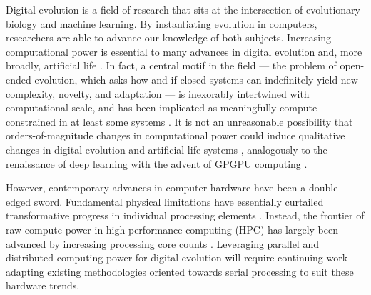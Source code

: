 Digital evolution is a field of research that sits at the intersection of evolutionary biology and machine learning.
By instantiating evolution in computers, researchers are able to advance our knowledge of both subjects.
Increasing computational power is essential to many advances in digital evolution and, more broadly, artificial life \citep{ackley2014indefinitely}.
In fact, a central motif in the field --- the problem of open-ended evolution, which asks how and if closed systems can indefinitely yield new complexity, novelty, and adaptation --- is inexorably intertwined with computational scale, and has been implicated as meaningfully compute-constrained in at least some systems \citep{taylor2016open,channon2019maximum}.
It is not an unreasonable possibility that orders-of-magnitude changes in computational power could induce qualitative changes in digital evolution and artificial life systems \citep{moreno2022engineering}, analogously to the renaissance of deep learning with the advent of GPGPU computing \citep{krizhevsky2012imagenet}.

However, contemporary advances in computer hardware have been a double-edged sword.
Fundamental physical limitations have essentially curtailed transformative progress in individual processing elements \citep{sutter2005free}.
Instead, the frontier of raw compute power in high-performance computing (HPC) has largely been advanced by increasing processing core counts \citep{morgenstern2021unparalleled}.
Leveraging parallel and distributed computing power for digital evolution will require continuing work adapting existing methodologies oriented towards serial processing to suit these hardware trends.


